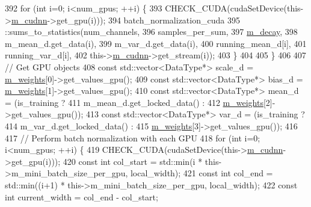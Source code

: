 \begin{DoxyCode}
392       \textcolor{keywordflow}{for} (\textcolor{keywordtype}{int} i=0; i<num\_gpus; ++i) \{
393         CHECK\_CUDA(cudaSetDevice(this->\hyperlink{classlbann_1_1Layer_a08dbb94239e3b8c96329786c57c72e21}{m\_cudnn}->get\_gpu(i)));
394         batch\_normalization\_cuda
395           ::sums\_to\_statistics(num\_channels,
396                                samples\_per\_sum,
397                                \hyperlink{classlbann_1_1batch__normalization_aa2ee72d5efbf47c74796510ee61dbb14}{m\_decay},
398                                m\_mean\_d.get\_data(i),
399                                m\_var\_d.get\_data(i),
400                                running\_mean\_d[i],
401                                running\_var\_d[i],
402                                this->\hyperlink{classlbann_1_1Layer_a08dbb94239e3b8c96329786c57c72e21}{m\_cudnn}->get\_stream(i));
403       \}
404 
405     \}
406 
407     \textcolor{comment}{// Get GPU objects}
408     \textcolor{keyword}{const} std::vector<DataType*> scale\_d = \hyperlink{classlbann_1_1Layer_a7954e30fbf9100a6ba4b56d02767a469}{m\_weights}[0]->get\_values\_gpu();
409     \textcolor{keyword}{const} std::vector<DataType*> bias\_d = \hyperlink{classlbann_1_1Layer_a7954e30fbf9100a6ba4b56d02767a469}{m\_weights}[1]->get\_values\_gpu();
410     \textcolor{keyword}{const} std::vector<DataType*> mean\_d = (is\_training ?
411                                            m\_mean\_d.get\_locked\_data() :
412                                            \hyperlink{classlbann_1_1Layer_a7954e30fbf9100a6ba4b56d02767a469}{m\_weights}[2]->get\_values\_gpu());
413     \textcolor{keyword}{const} std::vector<DataType*> var\_d = (is\_training ?
414                                           m\_var\_d.get\_locked\_data() :
415                                           \hyperlink{classlbann_1_1Layer_a7954e30fbf9100a6ba4b56d02767a469}{m\_weights}[3]->get\_values\_gpu());
416 
417     \textcolor{comment}{// Perform batch normalization with each GPU}
418     \textcolor{keywordflow}{for} (\textcolor{keywordtype}{int} i=0; i<num\_gpus; ++i) \{
419       CHECK\_CUDA(cudaSetDevice(this->\hyperlink{classlbann_1_1Layer_a08dbb94239e3b8c96329786c57c72e21}{m\_cudnn}->get\_gpu(i)));
420       \textcolor{keyword}{const} \textcolor{keywordtype}{int} col\_start = std::min(i * this->m\_mini\_batch\_size\_per\_gpu, local\_width);
421       \textcolor{keyword}{const} \textcolor{keywordtype}{int} col\_end = std::min((i+1) * this->m\_mini\_batch\_size\_per\_gpu, local\_width);
422       \textcolor{keyword}{const} \textcolor{keywordtype}{int} current\_width = col\_end - col\_start;

\end{DoxyCode}

